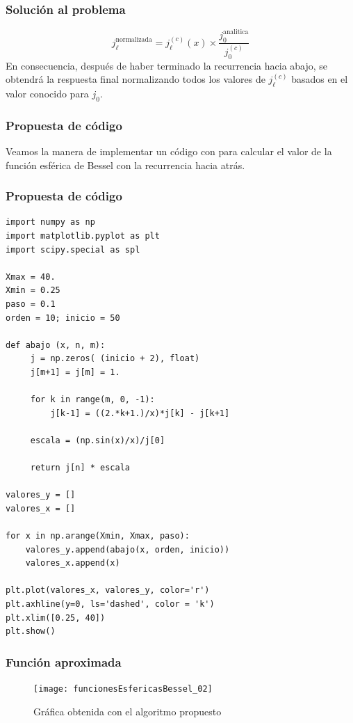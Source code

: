 \begin{frame}
\frametitle{Solución al problema}
\begin{equation}
j_{\ell}^{\text{normalizada}} = j_{\ell}^{(c)} (x) \times \dfrac{j_{0}^{\text{analitica}}}{j_{0}^{(c)}}
\label{eq:ecuacion_02_26}
\end{equation}
En consecuencia, después de haber terminado la recurrencia hacia abajo, se obtendrá la respuesta final normalizando todos los valores de $j_{\ell}^{(c)}$ basados en el valor conocido para $j_{0}$.
\end{frame}
\begin{frame}[fragile]
\frametitle{Propuesta de código}
Veamos la manera de implementar un código con \python para calcular el valor de la función esférica de Bessel con la recurrencia hacia atrás.
\end{frame}
\begin{frame}
\frametitle{Propuesta de código}
\begin{lstlisting}[style= FormattedNumber, basicstyle=\linespread{0.9}\ttfamily\small, columns=fullflexible]
import numpy as np
import matplotlib.pyplot as plt
import scipy.special as spl

Xmax = 40.
Xmin = 0.25
paso = 0.1
orden = 10; inicio = 50

def abajo (x, n, m):
     j = np.zeros( (inicio + 2), float)
     j[m+1] = j[m] = 1.
     
     for k in range(m, 0, -1):
         j[k-1] = ((2.*k+1.)/x)*j[k] - j[k+1]
     
     escala = (np.sin(x)/x)/j[0]
     
     return j[n] * escala

valores_y = []
valores_x = []

for x in np.arange(Xmin, Xmax, paso):
    valores_y.append(abajo(x, orden, inicio))
    valores_x.append(x)

plt.plot(valores_x, valores_y, color='r')
plt.axhline(y=0, ls='dashed', color = 'k')
plt.xlim([0.25, 40])
plt.show()
\end{lstlisting}
\end{frame}
\begin{frame}
\frametitle{Función aproximada}
\begin{figure}
\centering
\texttt{[image: funcionesEsfericasBessel\_02]}
\caption{Gráfica obtenida con el algoritmo propuesto}
\end{figure}
\end{frame}
